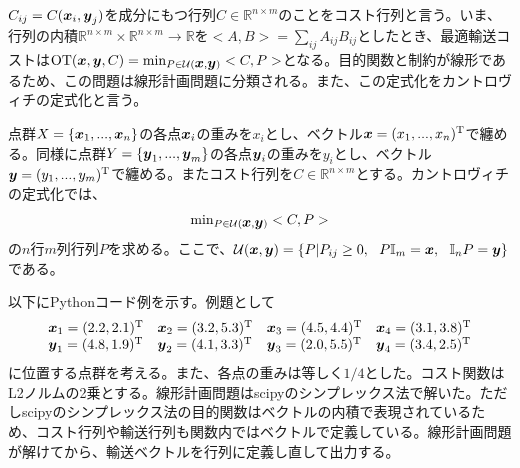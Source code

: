 \documentclass[dvipdfmx, 9pt, a4paper]{jsarticle}
\newcommand{\bm}[1]{{\mbox{\boldmath $#1$}}}
\begin{document}
$C_{ij}=C(\bm x_i, \bm y_j)$を成分にもつ行列$C \in \mathbb{R}^{n \times m}$のことをコスト行列と言う。いま、行列の内積$\mathbb{R}^{n \times m}\times \mathbb{R}^{n \times m} \to \mathbb{R}$を$<A, B>=\sum_{ij}A_{ij}B_{ij}$としたとき、最適輸送コストは${\rm OT}(\bm x, \bm y, C)={\rm min}_{P \in \mathcal{U}(\bm x, \bm y)}<C, P>$となる。目的関数と制約が線形であるため、この問題は線形計画問題に分類される。また、この定式化をカントロヴィチの定式化と言う。
\begin{tcolorbox}[title=カントロヴィチの定式化]
点群$X=\{\bm x_1, ..., \bm x_n\}$の各点$\bm x_i$の重みを$x_i$とし、ベクトル$\bm x=(x_1, ..., x_n)^{\rm T}$で纏める。同様に点群$Y=\{\bm y_1, ..., \bm y_m\}$の各点$\bm y_i$の重みを$y_i$とし、ベクトル$\bm y=(y_1, ..., y_m)^{\rm T}$で纏める。またコスト行列を$C \in \mathbb{R}^{n \times m}$とする。カントロヴィチの定式化では、
\begin{equation}
{\rm min}_{P \in \mathcal{U}(\bm x, \bm y)}<C, P>
\end{equation}
の$n$行$m$列行列$P$を求める。ここで、$\mathcal{U}(\bm x, \bm y)=\{P|P_{ij} \geq 0,~~P\mathbb{I}_m=\bm x,~~\mathbb{I}_nP=\bm y\}$である。
\end{tcolorbox}\par
以下にPythonコード例を示す。例題として
\begin{equation}
\begin{array}{llll}
\bm x_1 = (2.2, 2.1)^{\rm T}&\bm x_2 = (3.2, 5.3)^{\rm T}&\bm x_3 = (4.5, 4.4)^{\rm T}&\bm x_4 = (3.1, 3.8)^{\rm T} \\
\bm y_1 = (4.8, 1.9)^{\rm T}&\bm y_2 = (4.1, 3.3)^{\rm T}&\bm y_3 = (2.0, 5.5)^{\rm T}&\bm y_4 = (3.4, 2.5)^{\rm T} 
\end{array}\notag
\end{equation}
に位置する点群を考える。また、各点の重みは等しく$1/4$とした。コスト関数はL2ノルムの2乗とする。線形計画問題はscipyのシンプレックス法で解いた。ただしscipyのシンプレックス法の目的関数はベクトルの内積で表現されているため、コスト行列や輸送行列も関数内ではベクトルで定義している。線形計画問題が解けてから、輸送ベクトルを行列に定義し直して出力する。
\end{document}

